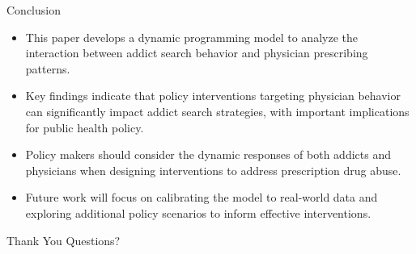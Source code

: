\documentclass[aspectratio=169,professionalfonts]{beamer}
\begin{document}
\begin{frame}{Conclusion}
  \begin{itemize}
    \item This paper develops a dynamic programming model to analyze the interaction between addict search behavior and physician prescribing patterns.
    \item Key findings indicate that policy interventions targeting physician behavior can significantly impact addict search strategies, with important implications for public health policy.
    \item Policy makers should consider the dynamic responses of both addicts and physicians when designing interventions to address prescription drug abuse.
    \item Future work will focus on calibrating the model to real-world data and exploring additional policy scenarios to inform effective interventions.
  \end{itemize}
\end{frame}

\begin{frame}{Thank You}
  \centering
  \Large Questions?
\end{frame}
\end{document}
